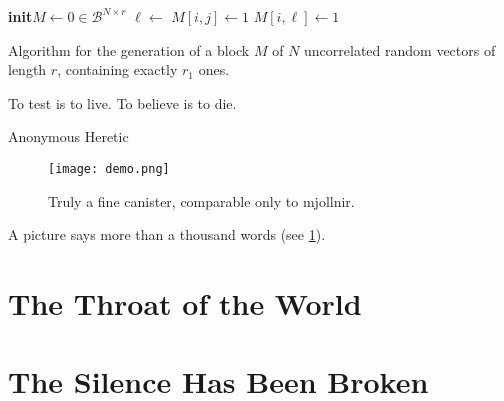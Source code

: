 \documentclass[a4paper,11pt]{memoir}
\begin{document}
\begin{algorithm}
	\small
	\begin{shaded}
		\begin{algorithmic}[1]
			\newcommand*{\To}{\textbf{to}\xspace}
			\newcommand*{\Init}{\State\textbf{init}\xspace}
			\newcommand*{\B}{\mathcal{B}}
			\Init \(M \gets 0 \in \B^{N \times r}\) 
			\For{ \(i \gets 1\) \To N}
				\For{ \(j \gets r - r_1 + 1\) \To \(r\)}
					\State \(\ell \gets \)  
						\State \({M}[i,j] \gets 1\)
					\Else
						\State \({M}[i,\ell] \gets 1\)
					\EndIf
				\EndFor
			\EndFor
		\end{algorithmic}
	\end{shaded}
	\caption[Uncorrelated random data generation]{Algorithm for the generation of a block $M$ of $N$ uncorrelated random vectors of length $r$, containing exactly $r_1$ ones.}
	\label{alg:binam_random_data}
\end{algorithm}

\epigraph{To test is to live. To believe is to die.}{Anonymous Heretic}
\blindtext

\begin{figure}
    \centering
    \texttt{[image: demo.png]}
    \caption{Truly a fine canister, comparable only to \gls{mjollnir}.}
    \label{fig:canister}
\end{figure}

\Blindtext\Blindtext

A picture says more than a thousand words (see \ref{fig:canister}).

\section{The Throat of the World}

\blindtext


\section{The Silence Has Been Broken}

\blindtext

\end{document}
